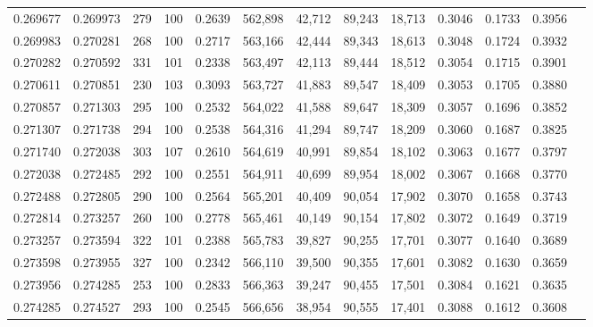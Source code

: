 \begin{tabular}{rrrrrrrrrrrrr}
0.269677 & 0.269973 &   279 & 100 &                                     0.2639 & 562,898 &  42,712 &  89,243 &  18,713 & 0.3046 & 0.1733 & 0.3956 \\
0.269983 & 0.270281 &   268 & 100 &                                     0.2717 & 563,166 &  42,444 &  89,343 &  18,613 & 0.3048 & 0.1724 & 0.3932 \\
0.270282 & 0.270592 &   331 & 101 &                                     0.2338 & 563,497 &  42,113 &  89,444 &  18,512 & 0.3054 & 0.1715 & 0.3901 \\
0.270611 & 0.270851 &   230 & 103 &                                     0.3093 & 563,727 &  41,883 &  89,547 &  18,409 & 0.3053 & 0.1705 & 0.3880 \\
0.270857 & 0.271303 &   295 & 100 &                                     0.2532 & 564,022 &  41,588 &  89,647 &  18,309 & 0.3057 & 0.1696 & 0.3852 \\
0.271307 & 0.271738 &   294 & 100 &                                     0.2538 & 564,316 &  41,294 &  89,747 &  18,209 & 0.3060 & 0.1687 & 0.3825 \\
0.271740 & 0.272038 &   303 & 107 &                                     0.2610 & 564,619 &  40,991 &  89,854 &  18,102 & 0.3063 & 0.1677 & 0.3797 \\
0.272038 & 0.272485 &   292 & 100 &                                     0.2551 & 564,911 &  40,699 &  89,954 &  18,002 & 0.3067 & 0.1668 & 0.3770 \\
0.272488 & 0.272805 &   290 & 100 &                                     0.2564 & 565,201 &  40,409 &  90,054 &  17,902 & 0.3070 & 0.1658 & 0.3743 \\
0.272814 & 0.273257 &   260 & 100 &                                     0.2778 & 565,461 &  40,149 &  90,154 &  17,802 & 0.3072 & 0.1649 & 0.3719 \\
0.273257 & 0.273594 &   322 & 101 &                                     0.2388 & 565,783 &  39,827 &  90,255 &  17,701 & 0.3077 & 0.1640 & 0.3689 \\
0.273598 & 0.273955 &   327 & 100 &                                     0.2342 & 566,110 &  39,500 &  90,355 &  17,601 & 0.3082 & 0.1630 & 0.3659 \\
0.273956 & 0.274285 &   253 & 100 &                                     0.2833 & 566,363 &  39,247 &  90,455 &  17,501 & 0.3084 & 0.1621 & 0.3635 \\
0.274285 & 0.274527 &   293 & 100 &                                     0.2545 & 566,656 &  38,954 &  90,555 &  17,401 & 0.3088 & 0.1612 & 0.3608 \\

\end{tabular}
